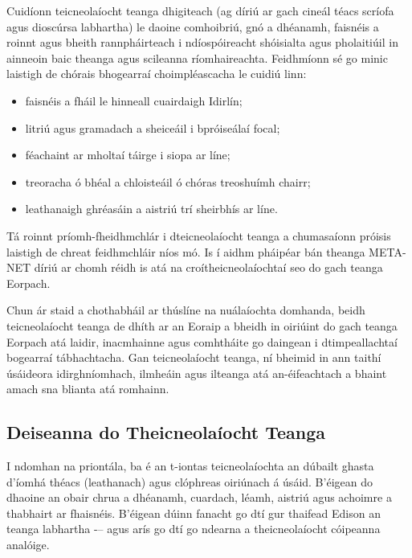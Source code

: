 \documentclass[]{../../metanetpaper}
\begin{document}
\begin{multicols}{2}
Cuidíonn teicneolaíocht teanga dhigiteach (ag díriú ar gach cineál téacs scríofa agus dioscúrsa labhartha) le daoine comhoibriú, gnó a dhéanamh, faisnéis a roinnt agus bheith rannpháirteach i ndíospóireacht shóisialta agus pholaitiúil in ainneoin baic theanga agus scileanna ríomhaireachta. Feidhmíonn sé go minic laistigh de chórais bhogearraí choimpléascacha le cuidiú linn:

\begin{itemize}
\item faisnéis a fháil le hinneall cuairdaigh Idirlín;
\item litriú agus gramadach a sheiceáil i bpróiseálaí focal;
\item féachaint ar mholtaí táirge i siopa ar líne;
\item treoracha ó bhéal a chloisteáil ó chóras treoshuímh chairr;
\item leathanaigh ghréasáin a aistriú trí sheirbhís ar líne. 
\end{itemize}

Tá roinnt príomh-fheidhmchlár i dteicneolaíocht teanga a chumasaíonn próisis laistigh de chreat feidhmchláir níos mó. Is í aidhm pháipéar bán theanga META-NET díriú ar chomh réidh is atá na croítheicneolaíochtaí seo do gach teanga Eorpach.  


Chun ár staid a chothabháil ar thúslíne na nuálaíochta domhanda, beidh teicneolaíocht teanga de dhíth ar an Eoraip a bheidh in oiriúint do gach teanga Eorpach atá laidir, inacmhainne agus comhtháite go daingean i dtimpeallachtaí bogearraí tábhachtacha. Gan teicneolaíocht teanga, ní bheimid in ann taithí úsáideora idirghníomhach, ilmheáin agus ilteanga atá an-éifeachtach a bhaint amach sna blianta atá romhainn.

\subsection{Deiseanna do Theicneolaíocht Teanga}

I ndomhan na priontála, ba é an t-iontas teicneolaíochta an dúbailt ghasta d'íomhá théacs (leathanach) agus clóphreas oiriúnach á úsáid. B’éigean do dhaoine an obair chrua a dhéanamh, cuardach, léamh, aistriú agus achoimre a thabhairt ar fhaisnéis. B’éigean dúinn fanacht go dtí gur thaifead Edison an teanga labhartha -– agus arís go dtí go ndearna a theicneolaíocht cóipeanna analóige.


\end{multicols}
\end{document}
